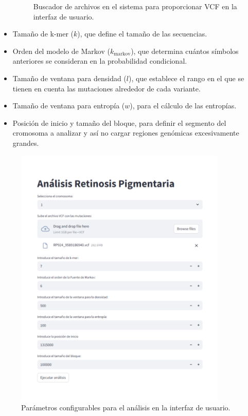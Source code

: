 \documentclass[11pt,spanish,listoffigures,listoftables]{tfgetsinf}
\begin{document}
\begin{itemize}
\begin{figure}[H]
      \caption{Buscador de archivos en el sistema para proporcionar VCF en la interfaz de usuario.}
      \label{fig:etiqueta_opcional7}
   \end{figure}
   \item Tamaño de k-mer ($k$), que define el tamaño de las secuencias. 
   \item Orden del modelo de Markov ($k_{\text{markov}}$), que determina cuántos símbolos anteriores se consideran en la probabilidad condicional.
   \item Tamaño de ventana para densidad ($l$), que establece el rango en el que se tienen en cuenta las mutaciones alrededor de cada variante. 
   \item Tamaño de ventana para entropía ($w$), para el cálculo de las entropías.
   \item Posición de inicio y tamaño del bloque, para definir el segmento del cromosoma a analizar y así no cargar regiones genómicas excesivamente grandes. 
\end{itemize}

\begin{figure}[H]
      \centering
      \includegraphics[width=0.9\textwidth]{Analisis_RP.png}
      \caption{Parámetros configurables para el análisis en la interfaz de usuario.}
      \label{fig:etiqueta_opcional8}
   \end{figure}
 
\end{document}
